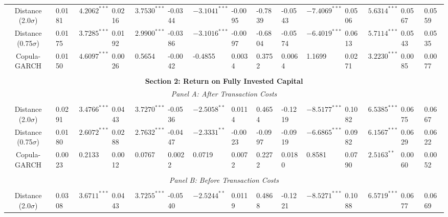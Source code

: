 \documentclass[a4paper]{article}
\begin{document}
\begin{sidewaystable}
\begin{threeparttable}[H]
\begin{tabularx}{\textwidth}{@{\extracolsep{\fill}}lllllllllllllll@{}}
				\multicolumn{1}{c}{Distance (2.0$\sigma$)} & 0.0181 & $4.2062^{***}$ & 0.0216 & $3.7530^{***}$ & -0.0344 & $-3.1041^{***}$ & -0.0095 & -0.7839 & -0.0543 & $-7.4069^{***}$ & 0.0506 & $5.6314^{***}$ & 0.0567 & 0.0559 \\
				\multicolumn{1}{c}{Distance (0.75$\sigma$)} & 0.0175 & $3.7285^{***}$ & 0.0192 & $2.9900^{***}$ & -0.0386 & $-3.1016^{***}$ & -0.0097 & -0.6804 & -0.0574 & $-6.4019^{***}$ & 0.0613 & $5.7114^{***}$ & 0.0543 & 0.0535  \\
				\multicolumn{1}{c}{Copula-GARCH} & 0.0150 & $4.6097^{***}$ & 0.0026 & 0.5654 & -0.0042 & -0.4855 & 0.0034 & 0.3752 & 0.0064 & 1.1699 & 0.0271 & $3.2230^{***}$ & 0.0085 & 0.0077 \\
				&       &       &       &       &       &       &       &       &       &       &       &       &       &  \\
				\midrule
				\multicolumn{15}{c}{\textbf{Section 2: Return on Fully Invested Capital}} \\
				\multicolumn{15}{c}{\textit{Panel A: After Transaction Costs}} \\
				&       &       &       &       &       &       &       &       &       &       &       &       &       &  \\
				\multicolumn{1}{c}{Distance (2.0$\sigma$)} & 0.0291 & $3.4766^{***}$ & 0.0443 & $3.7270^{***}$ & -0.0536 & $-2.5058^{**}$ & 0.0114 & 0.4654 & -0.1219 & $-8.5177^{***}$ & 0.1082 & $6.5385^{***}$ & 0.0675 & 0.0667 \\
				\multicolumn{1}{c}{Distance (0.75$\sigma$)} & 0.0180 & $2.6072^{***}$ & 0.0288 & $2.7632^{***}$ & -0.0447 & $-2.3331^{**}$ & -0.0023 & -0.0997 & -0.0919 & $-6.6865^{***}$ & 0.0982 & $6.1567^{***}$ & 0.0629 & 0.0622  \\
				\multicolumn{1}{c}{Copula-GARCH} & 0.0023 & 0.2133 & 0.0012 & 0.0767 & 0.0022 & 0.0719 & 0.0072 & 0.2272 & 0.0180 & 0.8581 & 0.0790 & $2.5163^{**}$ & 0.0060 & 0.0052 \\
				&       &       &       &       &       &       &       &       &       &       &       &       &       &  \\
				\multicolumn{15}{c}{\textit{Panel B: Before Transaction Costs}} \\
				&       &       &       &       &       &       &       &       &       &       &       &       &       &  \\
				\multicolumn{1}{c}{Distance (2.0$\sigma$)} & 0.0308 & $3.6711^{***}$ & 0.0443 & $3.7255^{***}$ & -0.0540 & $-2.5244^{**}$ & 0.0119 & 0.4868 & -0.1221 & $-8.5271^{***}$ & 0.1088 & $6.5719^{***}$ & 0.0677 & 0.0669 \\

\end{tabularx}
\end{threeparttable}
\end{sidewaystable}
\end{document}
